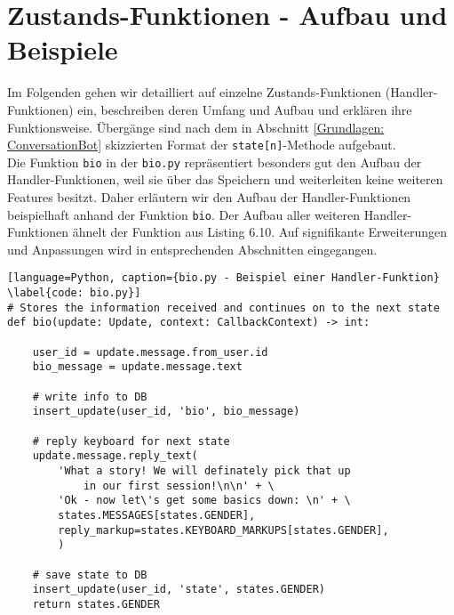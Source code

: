     \section{Zustands-Funktionen - Aufbau und Beispiele} \label{Implementierung: Handler Functions}
        Im Folgenden gehen wir detailliert auf einzelne Zustands-Funktionen (Handler-Funktionen) ein, beschreiben deren Umfang und Aufbau und erklären ihre Funktionsweise. Übergänge sind nach dem in Abschnitt \ref{Grundlagen: ConversationBot} skizzierten Format der \verb|state[n]|-Methode aufgebaut. \\
        Die Funktion \verb|bio| in der \verb|bio.py| repräsentiert besonders gut den Aufbau der Handler-Funktionen, weil sie über das Speichern und weiterleiten keine weiteren Features besitzt. Daher erläutern wir den Aufbau der Handler-Funktionen beispielhaft anhand der Funktion \verb|bio|. Der Aufbau aller weiteren Handler-Funktionen ähnelt der Funktion aus Listing 6.10. Auf signifikante Erweiterungen und Anpassungen wird in entsprechenden Abschnitten eingegangen. 

            \begin{lstlisting}[language=Python, caption={bio.py - Beispiel einer Handler-Funktion} \label{code: bio.py}]
# Stores the information received and continues on to the next state
def bio(update: Update, context: CallbackContext) -> int:
    
    user_id = update.message.from_user.id
    bio_message = update.message.text
    
    # write info to DB
    insert_update(user_id, 'bio', bio_message)

    # reply keyboard for next state
    update.message.reply_text(
        'What a story! We will definately pick that up 
            in our first session!\n\n' + \
        'Ok - now let\'s get some basics down: \n' + \
        states.MESSAGES[states.GENDER],
        reply_markup=states.KEYBOARD_MARKUPS[states.GENDER],
        )

    # save state to DB
    insert_update(user_id, 'state', states.GENDER)
    return states.GENDER
            \end{lstlisting}

